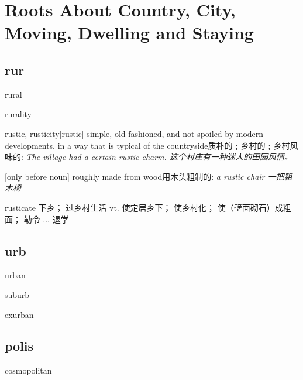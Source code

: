 \chapter{Roots  About Country, City, Moving, Dwelling and Staying}

\section{rur}

\begin{RefWord}{rural}
\end{RefWord}

\begin{RefWord}{rurality}
\end{RefWord}

\begin{RefWord}{rustic, rusticity}[rustic]
    simple, old-fashioned, and not spoiled by modern developments, in a way that is typical of the countryside质朴的﹔乡村的﹔乡村风味的:
    \textit{The village had a certain rustic charm. 这个村庄有一种迷人的田园风情。}

    [only before noun] roughly made from wood用木头粗制的:
    \textit{a rustic chair 一把粗木椅}
\end{RefWord}

\begin{RefWord}{rusticate}
    下乡； 过乡村生活 vt. 使定居乡下； 使乡村化； 使（壁面砌石）成粗面； 勒令 ... 退学
\end{RefWord}



\section{urb}

\begin{RefWord}{urban}
\end{RefWord}

\begin{RefWord}{suburb}
\end{RefWord}

\begin{RefWord}{exurban}
\end{RefWord}

\section{polis}

\begin{RefWord}{cosmopolitan}
\end{RefWord}


